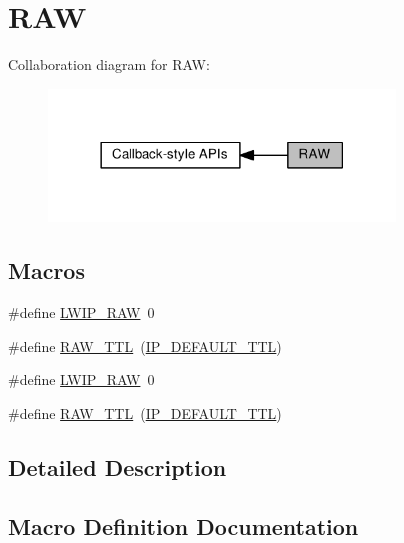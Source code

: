 \hypertarget{group__lwip__opts__raw}{}\section{R\+AW}
\label{group__lwip__opts__raw}
Collaboration diagram for R\+AW\+:
\nopagebreak
\begin{figure}[H]
\begin{center}
\leavevmode
\includegraphics[width=261pt]{group__lwip__opts__raw}
\end{center}
\end{figure}
\subsection*{Macros}
\begin{DoxyCompactItemize}
\item 
\#define \hyperlink{group__lwip__opts__raw_gaca452be5cb05d9666f8f57e582c39221}{L\+W\+I\+P\+\_\+\+R\+AW}~0
\item 
\#define \hyperlink{group__lwip__opts__raw_ga36e3ffa66073ca0d27d11c422778249c}{R\+A\+W\+\_\+\+T\+TL}~(\hyperlink{group__lwip__opts__ipv4_ga556b9b58fd02c0fdd126791baef77411}{I\+P\+\_\+\+D\+E\+F\+A\+U\+L\+T\+\_\+\+T\+TL})
\item 
\#define \hyperlink{group__lwip__opts__raw_gaca452be5cb05d9666f8f57e582c39221}{L\+W\+I\+P\+\_\+\+R\+AW}~0
\item 
\#define \hyperlink{group__lwip__opts__raw_ga36e3ffa66073ca0d27d11c422778249c}{R\+A\+W\+\_\+\+T\+TL}~(\hyperlink{group__lwip__opts__ipv4_ga556b9b58fd02c0fdd126791baef77411}{I\+P\+\_\+\+D\+E\+F\+A\+U\+L\+T\+\_\+\+T\+TL})
\end{DoxyCompactItemize}


\subsection{Detailed Description}


\subsection{Macro Definition Documentation}
\mbox{\label{group__lwip__opts__raw_gaca452be5cb05d9666f8f57e582c39221}} 
